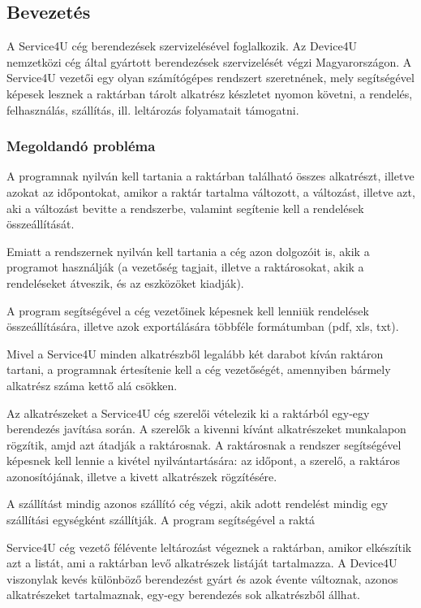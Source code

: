 \documentclass[11pt]{article}\usepackage[left=20mm,right=20mm,top=15mm,bottom=20mm]{geometry}
\begin{document}
\subsection{Bevezetés}
A Service4U cég berendezések szervizelésével foglalkozik. Az Device4U nemzetközi cég által
gyártott berendezések szervizelését végzi Magyarországon.
A Service4U vezetői egy olyan számítógépes rendszert szeretnének, mely segítségével képesek
lesznek a raktárban tárolt alkatrész készletet nyomon követni, a rendelés, felhasználás, szállítás, ill.
leltározás folyamatait támogatni.

\subsubsection{Megoldandó probléma}
A programnak nyilván kell tartania a raktárban található összes alkatrészt, illetve azokat az időpontokat, amikor a raktár tartalma változott, a változást, illetve azt, aki a változást bevitte a rendszerbe, valamint segítenie kell a rendelések összeállítását.

Emiatt a rendszernek nyilván kell tartania a cég azon dolgozóit is, akik a programot használják (a vezetőség tagjait, illetve a raktárosokat, akik a rendeléseket átveszik, és az eszközöket kiadják).

A program segítségével a cég vezetőinek képesnek kell lenniük rendelések összeállítására, illetve azok exportálására többféle formátumban (pdf, xls, txt).
 
Mivel a Service4U minden alkatrészből legalább két darabot kíván raktáron tartani, a programnak értesítenie kell a cég vezetőségét, amennyiben bármely alkatrész száma kettő alá csökken.

Az alkatrészeket a Service4U cég szerelői vételezik ki a raktárból egy-egy berendezés javítása
során. 
A szerelők a kivenni kívánt alkatrészeket munkalapon rögzítik, amjd azt átadják a raktárosnak. 
A raktárosnak a rendszer segítségével képesnek kell lennie a kivétel nyilvántartására: az időpont, a szerelő, a raktáros azonosítójának, illetve a kivett alkatrészek rögzítésére.

A szállítást mindig azonos szállító cég végzi, akik adott rendelést mindig egy szállítási egységként szállítják.
A program segítségével a raktá

Service4U cég vezető félévente leltározást végeznek a raktárban, amikor elkészítik azt a listát, ami a
raktárban levő alkatrészek listáját tartalmazza.
A Device4U viszonylak kevés különböző berendezést gyárt és azok évente változnak, azonos
alkatrészeket tartalmaznak, egy-egy berendezés sok alkatrészből állhat.
\end{document}
